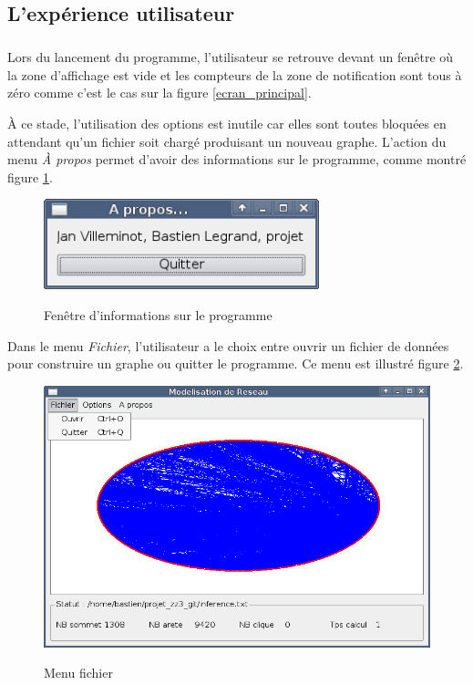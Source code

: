 \subsection{L'exp\'erience utilisateur}
\subparagraph{}
Lors du lancement du programme, l'utilisateur se retrouve devant un fen\^etre o\`u la zone d'affichage est vide et les compteurs de la zone de notification sont tous \`a z\'ero comme c'est le cas sur la figure \ref{ecran_principal}.
\par
\`A ce stade, l'utilisation des options est inutile car elles sont toutes bloqu\'ees en attendant qu'un fichier soit charg\'e produisant un nouveau graphe. L'action du menu \textit{\`A propos} permet d'avoir des informations sur le programme, comme montr\'e figure \ref{ecran_about}.

\begin{figure}[H]
\centering
 \fbox
 {
 \includegraphics[width=8cm]{./schema/capture_ecran_about.png}
 }
  \caption{\label{ecran_about}Fen\^etre d'informations sur le programme}
\end{figure}

\par
Dans le menu \textit{Fichier}, l'utilisateur a le choix entre ouvrir un fichier de donn\'ees pour construire un graphe ou quitter le programme. Ce menu est illustr\'e figure \ref{ecran_fichier}.

\begin{figure}[H]
\centering
 \fbox
 {
 \includegraphics[width=12cm]{./schema/capture_ecran_fichier.png}
 }
  \caption{\label{ecran_fichier}Menu fichier}
\end{figure}

